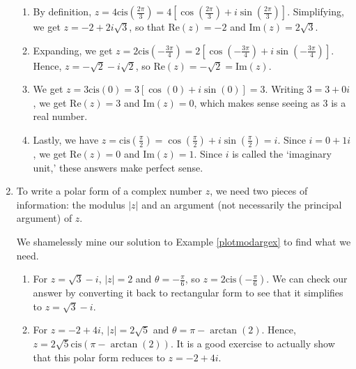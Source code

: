 \documentclass{ximera}
\begin{document}
\begin{ex}
\begin{enumerate}
\begin{enumerate}

\item By definition, $z =4 \text{cis}\left(\frac{2\pi}{3}\right) = 4\left[\cos\left(\frac{2\pi}{3}\right) + i \sin\left(\frac{2\pi}{3}\right)\right]$.  Simplifying, we get $z = -2 + 2i\sqrt{3}$, so that $\text{Re}(z) = -2$ and $\text{Im}(z) = 2\sqrt{3}$.

\item Expanding, we get $z = 2 \text{cis}\left(-\frac{3\pi}{4}\right) = 2\left[\cos\left(-\frac{3\pi}{4}\right) + i \sin\left(-\frac{3\pi}{4}\right)\right]$. Hence, $z= -\sqrt{2} - i\sqrt{2}$, so $\text{Re}(z) = -\sqrt{2} = \text{Im}(z)$.

\item  We get  $z = 3 \text{cis}(0) = 3\left[\cos(0) + i\sin(0)\right] = 3$.  Writing $3 = 3 + 0i$, we get $\text{Re}(z) = 3$ and $\text{Im}(z) = 0$, which makes sense seeing as $3$ is a real number.

\item  Lastly, we have  $z = \text{cis}\left(\frac{\pi}{2}\right) = \cos\left(\frac{\pi}{2}\right)+ i\sin\left(\frac{\pi}{2}\right) = i$.  Since $i = 0 + 1i$, we get $\text{Re}(z) = 0$ and $\text{Im}(z) = 1$.  Since $i$ is called the `imaginary unit,'  these answers make perfect sense.

\end{enumerate}

\item  To write a polar form of a complex number $z$, we need two pieces of information:  the modulus $|z|$ and an argument (not necessarily the principal argument) of $z$.   

\smallskip

We shamelessly mine our solution to  Example \ref{plotmodargex} to find what we need.

\begin{enumerate}

\item  For $z = \sqrt{3}-i$, $|z| = 2$ and $\theta = -\frac{\pi}{6}$, so $z = 2 \text{cis}\left(-\frac{\pi}{6}\right)$.  We can check our answer by converting it back to rectangular form to see that it simplifies to $z = \sqrt{3} - i$.

\item  For $z = -2+4i$, $|z| = 2\sqrt{5}$ and $\theta = \pi - \arctan(2)$.  Hence, $z = 2\sqrt{5} \text{cis}(\pi - \arctan(2))$.  It is a good exercise to actually show that this polar form reduces to $z=-2+4i$.


\end{enumerate}
\end{enumerate}
\end{ex}
\end{document}
